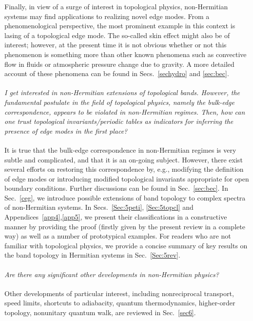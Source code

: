 \documentclass{tADP2e}
\theoremstyle{plain}
\theoremstyle{plain}
\theoremstyle{definition}
\begin{document}
Finally, in view of a surge of interest in topological physics, non-Hermitian systems may find applications to realizing novel edge modes. From a phenomenological perspective, the most prominent example in this context is lasing of a topological edge mode. The so-called skin effect might also be of interest; however, at the present time it is not obvious whether or not this phenomenon is something more than other known phenomena such as convective flow in fluids or atmospheric pressure change due to gravity. A more detailed account of these phenomena can be found in Secs.~\ref{sechydro} and \ref{sec:bec}. 
\\
\\
{\it I get interested in non-Hermitian extensions of topological bands. However, the fundamental postulate in the field of topological physics, namely the bulk-edge correspondence, appears to be violated in non-Hermitian regimes. Then, how can one trust topological invariants/periodic tables as indicators for inferring the presence of edge modes in the first place?}
\\
\\ 
It is true that the bulk-edge correspondence in non-Hermitian regimes is very subtle and complicated, and that it is an on-going subject. However, there exist several efforts on restoring this correspondence by, e.g., modifying the definition of edge modes or introducing modified topological invariants appropriate for open boundary conditions. Further discussions can be found in Sec.~\ref{sec:bec}. In Sec.~\ref{ceg}, we  introduce possible extensions of band topology to complex spectra of non-Hermitian systems. In Secs.~\ref{Sec:5peti}, \ref{Sec:5topcl} and Appendices~\ref{app4},\ref{app5}, we present their classifications in a  constructive manner by providing the proof (firstly given by the present review in a complete way) as well as a number of prototypical examples. For readers who are not familiar with topological physics, we provide a concise summary of key results on the band topology in Hermitian systems in Sec.~\ref{Sec:5rev}. 
\\
\\
{\it Are there any significant other developments in non-Hermitian physics?}
\\
\\
Other developments of particular interest, including nonreciprocal transport, speed limits, shortcuts to adiabacity, quantum thermodynamics, higher-order topology, nonunitary quantum walk, are reviewed in Sec.~\ref{sec6}. 
\end{document}

